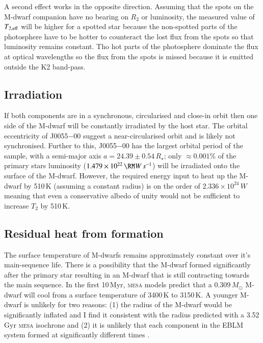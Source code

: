 A second effect works in the opposite direction. Assuming that the spots on the M-dwarf companion have no bearing on $R_2$ or luminosity, the measured value of $T_{\rm 2,eff}$ will be higher for a spotted star because the non-spotted parts of the photosphere have to be hotter to counteract the lost flux from the spots so that luminosity remains constant. Tho hot parts of the photosphere dominate the flux at optical wavelengths so the flux from the spots is missed because it is emitted outside the K2 band-pass.



\subsection{Irradiation}

If both components are in a synchronous, circularised and close-in orbit then one side of the M-dwarf will be constantly irradiated by the host star. The orbital eccentricity  of J0055$-$00 suggest a near-circularised orbit and is likely not synchronised. Further to this, J0055$-$00 has the largest orbital period of the sample, with a semi-major axis $a = 24.39 \pm 0.54\,R_\star$; only $\approx 0.001\%$ of the primary stars luminosity ($1.479 \times 10^{22}\, \RM W\,s^{-1}$) will be irradiated onto the surface of the M-dwarf. However, the required energy input to heat up the M-dwarf by 510\,K (assuming a constant radius) is on the order of $2.336 \times 10^{24}\,W$ meaning that even a conservative albedo of unity would not be sufficient to increase $T_2$ by 510\,K.


\subsection{Residual heat from formation}

The surface temperature of M-dwarfs remains approximately constant over it's main-sequence life. There is a possibility that the M-dwarf formed significantly after the primary star resulting in an M-dwarf that is still contracting towards the main sequence. In the first 10\,Myr, \textsc{mesa} models predict that a 0.309\,$M_\odot$ M-dwarf will cool from a surface temperature of 3400\,K to 3150\,K. A younger M-dwarf is unlikely for two reasons: (1) the radius of the M-dwarf would be significantly inflated and I find it consistent with the radius predicted with a 3.52\,Gyr \textsc{mesa} isochrone and (2) it is unlikely that each component in the EBLM system formed at significantly different times \citep{2003ApJ...584..853P}. 


